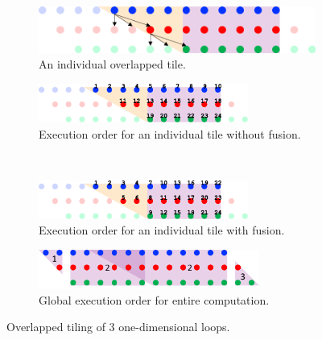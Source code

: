 \documentclass{article}
\begin{document}
\begin{figure}
\begin{subfigure}[t]{0.45\textwidth}
	\end{subfigure}
	~~
	\begin{subfigure}[t]{0.45\textwidth}
		\centering
		\includegraphics[height=.5in]{TilingProcess/TilingProcess6.png}
		\caption{An individual overlapped tile.}
	\end{subfigure}
	\par\bigskip
	\begin{subfigure}[t]{0.45\textwidth}
		\centering
		\includegraphics[height=0.5in]{TilingProcess/TilingProcess7.pdf}
		\caption{Execution order for an individual tile without fusion.}
		\label{tileNofuse}
	\end{subfigure}
	~~
	\begin{subfigure}[t]{0.45\textwidth}
		\centering
		\includegraphics[height=0.5in]{TilingProcess/TilingProcess8.pdf}
		\caption{Execution order for an individual tile with fusion.}
		\label{tileFuse}
	\end{subfigure}
	\par\bigskip
	\begin{subfigure}[t]{\textwidth}
		\centering
		\includegraphics[height=0.5in]{TilingProcess/TilingProcess9.pdf}
		\caption{Global execution order for entire computation.}
		\label{tiling9}
	\end{subfigure}

\caption{Overlapped tiling of 3 one-dimensional loops.}
\label{tilingProcess}
\end{figure}
\end{document}
